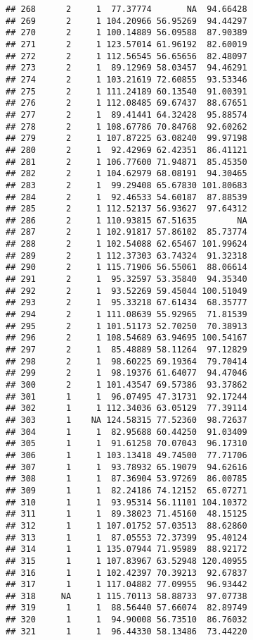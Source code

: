 \documentclass[
]{article}
\begin{document}
\begin{verbatim}
## 268      2     1  77.37774       NA  94.66428
## 269      2     1 104.20966 56.95269  94.44297
## 270      2     1 100.14889 56.09588  87.90389
## 271      2     1 123.57014 61.96192  82.60019
## 272      2     1 112.56545 56.65656  82.48097
## 273      2     1  89.12969 58.03457  94.46291
## 274      2     1 103.21619 72.60855  93.53346
## 275      2     1 111.24189 60.13540  91.00391
## 276      2     1 112.08485 69.67437  88.67651
## 277      2     1  89.41441 64.32428  95.88574
## 278      2     1 108.67786 70.84768  92.60262
## 279      2     1 107.87225 63.08240  99.97198
## 280      2     1  92.42969 62.42351  86.41121
## 281      2     1 106.77600 71.94871  85.45350
## 282      2     1 104.62979 68.08191  94.30465
## 283      2     1  99.29408 65.67830 101.80683
## 284      2     1  92.46533 54.60187  87.88539
## 285      2     1 112.52137 56.93627  97.64312
## 286      2     1 110.93815 67.51635        NA
## 287      2     1 102.91817 57.86102  85.73774
## 288      2     1 102.54088 62.65467 101.99624
## 289      2     1 112.37303 63.74324  91.32318
## 290      2     1 115.71906 56.55061  88.06614
## 291      2     1  95.32597 53.35840  94.35340
## 292      2     1  93.52269 59.45044 100.51049
## 293      2     1  95.33218 67.61434  68.35777
## 294      2     1 111.08639 55.92965  71.81539
## 295      2     1 101.51173 52.70250  70.38913
## 296      2     1 108.54689 63.94695 100.54167
## 297      2     1  85.48889 58.11264  97.12829
## 298      2     1  98.60225 69.19364  79.70414
## 299      2     1  98.19376 61.64077  94.47046
## 300      2     1 101.43547 69.57386  93.37862
## 301      1     1  96.07495 47.31731  92.17244
## 302      1     1 112.34036 63.05129  77.39114
## 303      1    NA 124.58315 77.52360  98.72637
## 304      1     1  82.95688 60.44250  91.03409
## 305      1     1  91.61258 70.07043  96.17310
## 306      1     1 103.13418 49.74500  77.71706
## 307      1     1  93.78932 65.19079  94.62616
## 308      1     1  87.36904 53.97269  86.00785
## 309      1     1  82.24186 74.12152  65.07271
## 310      1     1  93.95314 56.11101 104.10372
## 311      1     1  89.38023 71.45160  48.15125
## 312      1     1 107.01752 57.03513  88.62860
## 313      1     1  87.05553 72.37399  95.40124
## 314      1     1 135.07944 71.95989  88.92172
## 315      1     1 107.83967 63.52948 120.40955
## 316      1     1 102.42397 70.39213  92.67837
## 317      1     1 117.04882 77.09955  96.93442
## 318     NA     1 115.70113 58.88733  97.07738
## 319      1     1  88.56440 57.66074  82.89749
## 320      1     1  94.90008 56.73510  86.76032
## 321      1     1  96.44330 58.13486  73.44220

\end{verbatim}
\end{document}
